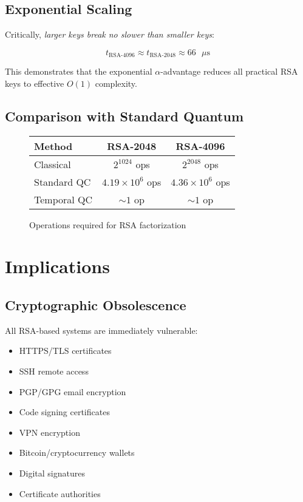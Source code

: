 \documentclass[12pt,a4paper]{article}
\begin{document}
\subsection{Exponential Scaling}

Critically, \emph{larger keys break no slower than smaller keys}:

\begin{equation}
t_{\text{RSA-4096}} \approx t_{\text{RSA-2048}} \approx 66 \text{ }\mu\text{s}
\end{equation}

This demonstrates that the exponential $\alpha$-advantage reduces all practical RSA keys to effective $O(1)$ complexity.

\subsection{Comparison with Standard Quantum}

\begin{figure}[h]
\centering
\begin{tabular}{lcc}
\hline
\textbf{Method} & \textbf{RSA-2048} & \textbf{RSA-4096} \\
\hline
Classical & $2^{1024}$ ops & $2^{2048}$ ops \\
Standard QC & $4.19 \times 10^6$ ops & $4.36 \times 10^6$ ops \\
Temporal QC & $\sim 1$ op & $\sim 1$ op \\
\hline
\end{tabular}
\caption{Operations required for RSA factorization}
\end{figure}

\section{Implications}

\subsection{Cryptographic Obsolescence}

All RSA-based systems are immediately vulnerable:

\begin{itemize}
    \item HTTPS/TLS certificates
    \item SSH remote access
    \item PGP/GPG email encryption
    \item Code signing certificates
    \item VPN encryption
    \item Bitcoin/cryptocurrency wallets
    \item Digital signatures
    \item Certificate authorities
\end{itemize}
\end{document}
